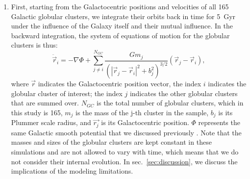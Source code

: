 \documentclass{aa}
\begin{document}
      \begin{enumerate}
          \item First, starting from the Galactocentric positions and velocities of all 165 Galactic globular clusters, we integrate their orbits back in time for 5~Gyr under the influence of the Galaxy itself and their mutual influence. In the backward integration, the system of equations of motion for the globular clusters is thus: 
          \begin{equation}
          \ddot{\vec{r}}_i = -\nabla \Phi + \left.\sum_{j\neq i}^{N_{GC}} \frac{Gm_j}{\left(|\vec{r}_j - \vec{r}_i|^2 + b_j^2\right)^{3/2}}\right. \left(\vec{r}_j - \vec{r}_i\right),
          \end{equation}\label{eq:GCNBody} 
          \noindent where $\vec{r}$ indicates the Galactocentric position vector, the index $i$ indicates the globular cluster of interest; the index $j$ indicates the other globular clusters that are summed over. $N_{GC}$ is the total number of globular clusters, which in this study is 165, $m_j$ is the mass of the j-th cluster in the sample, $b_j$ is its Plummer scale radius, and $\vec{r_j}$ is its Galactocentric position. $\Phi$ represents the same Galactic smooth potential that we discussed previously \citep[][Model~II, in the present case]{2017A&A...598A..66P}. Note that the masses and sizes of the globular clusters are kept constant in these simulations and are not allowed to vary with time, which means that we do not consider their internal evolution. In sec.~\ref{sec:discussion}, we discuss the implications of the modeling limitations.
      

\end{enumerate}
\end{document}
